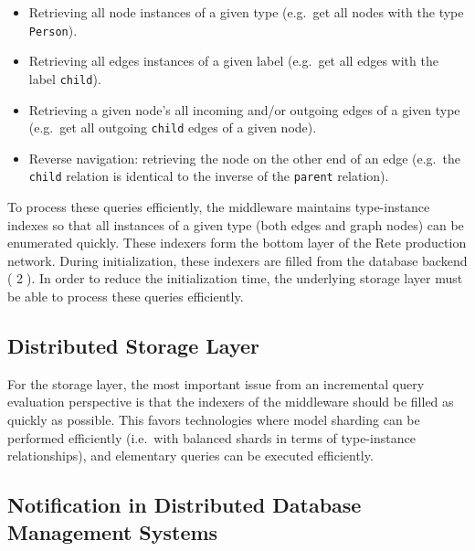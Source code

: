 \begin{itemize}
  \item Retrieving all node instances of a given type (e.g.\ get all nodes with the type \texttt{Person}).
  \item Retrieving all edges instances of a given label (e.g.\ get all edges with the label \texttt{child}).
  \item Retrieving a given node's all incoming and/or outgoing edges of a given type (e.g.\ get all outgoing \texttt{child} edges of a given node). 
  \item Reverse navigation: retrieving the node on the other end of an edge (e.g.\ the \texttt{child} relation is identical to the inverse of the \texttt{parent} relation). 
\end{itemize}

To process these queries efficiently, the \iqd{} middleware maintains type-instance indexes so that all instances of a given type (both edges and graph nodes) can be enumerated quickly. These indexers form the bottom layer of the Rete production network. During initialization, these indexers are filled from the database backend ( \textcircled{2}). In order to reduce the initialization time, the underlying storage layer must be able to process these queries efficiently. 


\subsection{Distributed Storage Layer}
\label{storage}

For the storage layer, the most important issue from an incremental query evaluation perspective is that the indexers of the middleware should be filled as quickly as possible. This favors technologies where model sharding can be performed efficiently (i.e.\ with balanced shards in terms of type-instance relationships), and elementary queries 
can be executed efficiently.


\subsection{Notification in Distributed Database Management Systems}

